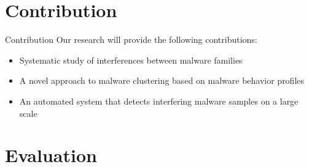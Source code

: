 \documentclass{beamer}
\begin{document}

\section{Contribution}
\begin{frame}[t]{Contribution}
Our research will provide the following contributions:
\begin{itemize}
  \item Systematic study of interferences between malware families
  \item A novel approach to malware clustering based on malware behavior profiles
  \item An automated system that detects interfering malware samples on a large scale
\end{itemize}
\end{frame}

\section{Evaluation}
\label{sec:Evaluation}
\end{document}
